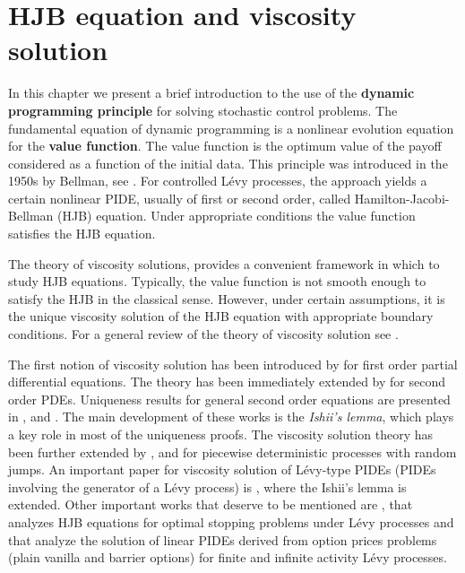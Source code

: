 

\chapter{HJB equation and viscosity solution}\label{Chapter4}
\minitoc%

\vspace{5em}

In this chapter we present a brief introduction to the use of the \textbf{dynamic programming principle} for solving stochastic control problems. 
The fundamental equation of dynamic programming is a nonlinear evolution equation for the \textbf{value function}.
The value function is the optimum value of the payoff considered as a function of the initial data.
This principle was introduced in the 1950s by Bellman, see \cite{Bellman}. 
For controlled Lévy processes,
the approach yields a certain nonlinear PIDE, usually of first or second order, called Hamilton-Jacobi-Bellman (HJB) equation. 
Under appropriate conditions the value function satisfies the HJB equation.

The theory of viscosity solutions, provides a convenient framework in which to study HJB equations.
Typically, the value function is not smooth enough to satisfy the HJB in the classical sense. However, under certain assumptions, it is the unique viscosity
solution of the HJB equation with appropriate boundary conditions. For a general review of the theory of viscosity solution see \cite{CIL92}.

The first notion of viscosity solution has been introduced by \cite{CL83} for first order partial differential equations. The theory has
been immediately extended by \cite{PLL83} for second order PDEs.
Uniqueness results for general second order equations are presented in \cite{Je88}, \cite{Is89} and \cite{IsLi90}. 
The main development of these works is the \emph{Ishii's lemma}, which plays a key role in most of the uniqueness proofs.
The viscosity solution theory has been further extended by \cite{Soner86b}, \cite{Soner86} and \cite{Sayah91} for piecewise deterministic processes with random jumps.
An important paper for viscosity solution of Lévy-type PIDEs (PIDEs involving the generator of a Lévy process) is \cite{BaIm08}, where the Ishii's
lemma is extended. 
Other important works that deserve to be mentioned are \cite{Ph98}, that analyzes HJB equations for optimal stopping problems under Lévy processes and \cite{CoVo05} that analyze
the solution of linear PIDEs derived from option prices problems (plain vanilla and barrier options) for finite and infinite activity Lévy processes.
\vspace{1em}

